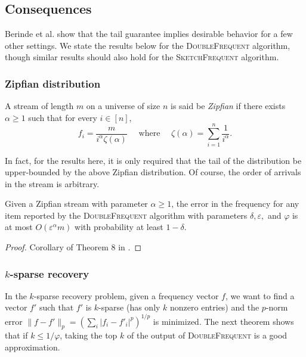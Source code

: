 \documentclass[sigconf,review=true,anonymous=true,screen]{acmart}
\newcommand{\eps}{\varepsilon}
\begin{document}
\subsection{Consequences}
Berinde et al. \cite{BCIS} show that the tail guarantee implies desirable behavior for a few other settings. We
state the results below for the \textsc{DoubleFrequent} algorithm, though similar results should also hold for
the \textsc{SketchFrequent} algorithm.

\subsubsection{Zipfian distribution}
A stream of length $m$ on a universe of size $n$ is said
be {\em Zipfian} if there exists $\alpha \geq 1$ such that for every
$i \in [n]$,
$$f_i =\frac{m}{i^\alpha \zeta(\alpha)} \quad \text{ where }	 \quad \zeta(\alpha)=\sum_{i=1}^n \frac{1}{i^\alpha}.$$

In fact, for the results here, it is only required that
the tail of the distribution be upper-bounded by the
above Zipfian distribution. Of course, the order of
arrivals in the stream is arbitrary.
\begin{theorem}Given a Zipfian stream with parameter
$\alpha\geq 1$, the error in the frequency for any item reported by the \textsc{DoubleFrequent} algorithm with parameters $\delta, \eps,$ and $\varphi$ is at most 
$O(\eps^\alpha m)$ with probability at least $1 -\delta$.
\end{theorem}
\begin{proof}
Corollary of Theorem 8 in \cite{BCIS}.
\end{proof}
\subsubsection{$k$-sparse recovery}
In the $k$-sparse recovery problem, given a frequency
vector $f$, we want to find a vector $f'$
such that $f'$ is
$k$-sparse (has only $k$ nonzero entries) and the $p$-norm
error $\|f - f'\|_p = (\sum_i |f_i - f'_i|^p)^{1/p}$ is minimized.
The next theorem shows that if $k ≤ 1/\varphi$, taking the
top $k$ of the output of \textsc{DoubleFrequent} is a good
approximation.
\end{document}
